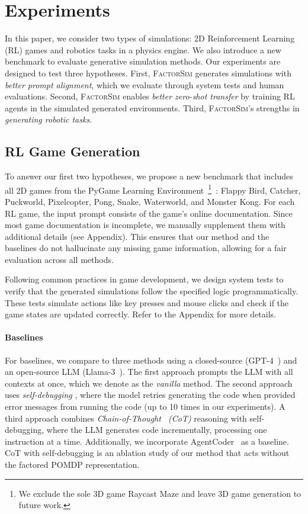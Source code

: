 \documentclass{article}
\theoremstyle{plain}
\theoremstyle{definition}
\theoremstyle{remark}
\newcommand{\method}{\textsc{FactorSim}\xspace}
\begin{document}
\section{Experiments}
In this paper, we consider two types of simulations: 2D Reinforcement Learning (RL) games and robotics tasks in a physics engine. We also introduce a new benchmark to evaluate generative simulation methods. Our experiments are designed to test three hypotheses. First, \method{} generates simulations with \textit{better prompt alignment}, which we evaluate through system tests and human evaluations. Second, \method{} enables \textit{better zero-shot transfer} by training RL agents in the simulated generated environments. Third, \method{}'s strengths in \textit{generating robotic tasks}.






\subsection{RL Game Generation}
To answer our first two hypotheses, we propose a new benchmark that includes all 2D games from the PyGame Learning Environment~\footnote{We exclude the sole 3D game Raycast Maze and leave 3D game generation to future work.}~\cite{tasfi2016PLE}: Flappy Bird, Catcher, Puckworld, Pixelcopter, Pong, Snake, Waterworld, and Monster Kong. 
For each RL game, the input prompt consists of the game's online documentation. Since most game documentation is incomplete, we manually supplement them with additional details (see Appendix). This ensures that our method and the baselines do not hallucinate any missing game information, allowing for a fair evaluation across all methods.

Following common practices in game development, we design system tests to verify that the generated simulations follow the specified logic programmatically. These tests simulate actions like key presses and mouse clicks and check if the game states are updated correctly. Refer to the Appendix for more details.



\paragraph{Baselines}
For baselines, we compare to three methods using a closed-source (GPT-4~\cite{achiam2023gpt}) and an open-source LLM (Llama-3~\cite{llama3modelcard}).
The first approach prompts the LLM with all contexts at once, which we denote as the \textit{vanilla} method.
The second approach uses \textit{self-debugging} \cite{chen2024teaching}, where the model retries generating the code when provided error messages from running the code (up to 10 times in our experiments).
A third approach combines \textit{Chain-of-Thought~\cite{wei2022chain} (CoT)} reasoning with self-debugging, where the LLM generates code incrementally, processing one instruction at a time. Additionally, we incorporate AgentCoder~\cite{huang2023agentcoder} as a baseline.
CoT with self-debugging is an ablation study of our method that acts without the factored POMDP representation.
\end{document}
